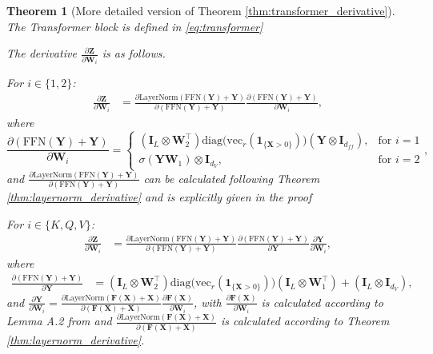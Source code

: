 \documentclass{article}
\newtheorem{theorem}{Theorem} %
\begin{document}
\begin{theorem}[More detailed version of Theorem \ref{thm:transformer_derivative}]
The Transformer block is defined in \ref{eq:transformer}

The derivative \(\frac{\partial\mathbf{Z}}{\partial \mathbf{W}_i}\) is as follows.

For $i \in \{1,2\}$:
\begin{align*}
    \frac{\partial\mathbf{Z}}{\partial \mathbf{W}_i} &= \frac{\partial \text{LayerNorm}(\text{FFN}(\mathbf{Y}) + \mathbf{Y})}{\partial (\text{FFN}(\mathbf{Y}) + \mathbf{Y})} \frac{\partial (\text{FFN}(\mathbf{Y}) + \mathbf{Y})}{\partial \mathbf{W}_i},
\end{align*}
where
\begin{equation*}
    \frac{\partial (\text{FFN}(\mathbf{Y}) + \mathbf{Y})}{\partial \mathbf{W}_i} = \begin{cases}
        \left(\mathbf{I}_L \otimes \mathbf{W}_2^\top \right) \mathrm{diag}\!\big(\mathrm{vec}_r(\mathbf{1}_{\{\mathbf{X}>0\}})\big) \left( \mathbf{Y} \otimes \mathbf{I}_{d_{ff}}\right), & \text{for } i = 1 \\
        \sigma(\mathbf{Y} \mathbf{W}_1) \otimes \mathbf{I}_{d_V}, & \text{for } i = 2
    \end{cases},
\end{equation*}
and \(\frac{\partial \text{LayerNorm}(\text{FFN}(\mathbf{Y}) + \mathbf{Y})}{\partial (\text{FFN}(\mathbf{Y}) + \mathbf{Y})} \) can be calculated following Theorem \ref{thm:layernorm_derivative} and is explicitly given in the proof

For $i \in \{ K, Q, V\}$:
\begin{align*}
    \frac{\partial\mathbf{Z}}{\partial \mathbf{W}_i} &= \frac{\partial \text{LayerNorm}(\text{FFN}(\mathbf{Y}) + \mathbf{Y})}{\partial (\text{FFN}(\mathbf{Y}) + \mathbf{Y})} \frac{\partial (\text{FFN}(\mathbf{Y}) + \mathbf{Y})}{\partial \mathbf{Y}} \frac{\partial \mathbf{Y}}{\partial \mathbf{W}_i},
\end{align*}
where
\begin{align*}
    \frac{\partial (\text{FFN}(\mathbf{Y}) + \mathbf{Y})}{\partial \mathbf{Y}} &= \left( \mathbf{I}_L \otimes \mathbf{W}_2^\top\right) \mathrm{diag}\!\big(\mathrm{vec}_r(\mathbf{1}_{\{\mathbf{X}>0\}})\big) \left( \mathbf{I}_L \otimes \mathbf{W}_1^\top \right) + \left( \mathbf{I}_L \otimes \mathbf{I}_{d_V}\right),
\end{align*}
and \(\frac{\partial \mathbf{Y}}{\partial\mathbf{W}_i} = \frac{\partial \text{LayerNorm}(\mathbf{F} (\mathbf{X}) + \mathbf{X})}{\partial (\mathbf{F} (\mathbf{X}) + \mathbf{X})} \frac{\partial \mathbf{F}(\mathbf{X})}{\partial \mathbf{W}_i}\), with \(\frac{\partial \mathbf{F}(\mathbf{X})}{\partial \mathbf{W}_i}\) is calculated according to Lemma A.2 from \cite{noci2022signalpropagationtransformerstheoretical} and \(\frac{\partial \text{LayerNorm}(\mathbf{F} (\mathbf{X}) + \mathbf{X})}{\partial (\mathbf{F} (\mathbf{X}) + \mathbf{X})}\) is calculated according to Theorem \ref{thm:layernorm_derivative}.
\end{theorem}
\end{document}

